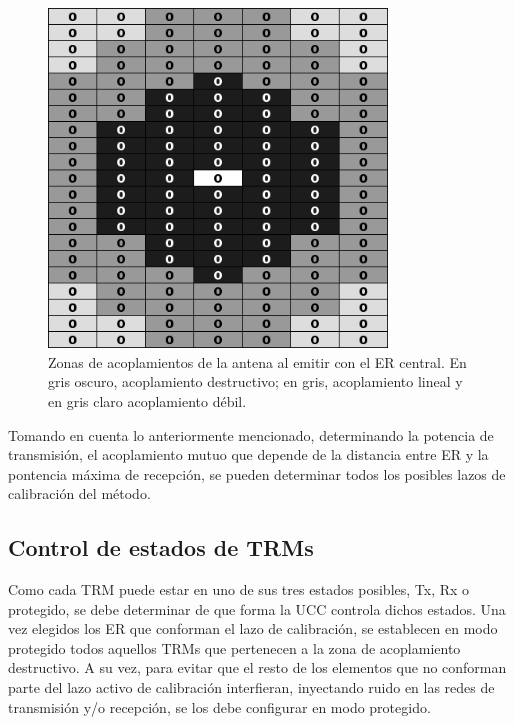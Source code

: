 \begin{figure}[H]
 \centering
 \includegraphics[width=9cm]{gfx/mutualCouplingLevels.png}
 \caption{Zonas de acoplamientos de la antena al emitir con el ER central. En gris oscuro, acoplamiento destructivo; en gris,
 acoplamiento lineal y en gris claro acoplamiento débil.}
 \label{fig:levels}
\end{figure}

Tomando en cuenta lo anteriormente mencionado, determinando la potencia de transmisión, el acoplamiento mutuo que depende de la
distancia entre ER y la pontencia máxima de recepción, se pueden determinar todos los posibles lazos de calibración del método.


\subsection{Control de estados de TRMs}

Como cada TRM puede estar en uno de sus tres estados posibles, Tx, Rx o protegido, se debe determinar de que forma la UCC
controla dichos estados. Una vez elegidos los ER que conforman el lazo de calibración, se establecen en modo protegido todos
aquellos TRMs que pertenecen a la zona de acoplamiento destructivo. A su vez, para evitar que el resto de los elementos que no
conforman parte del lazo activo de calibración interfieran, inyectando ruido en las redes de transmisión y/o recepción, se los
debe configurar en modo protegido. 

